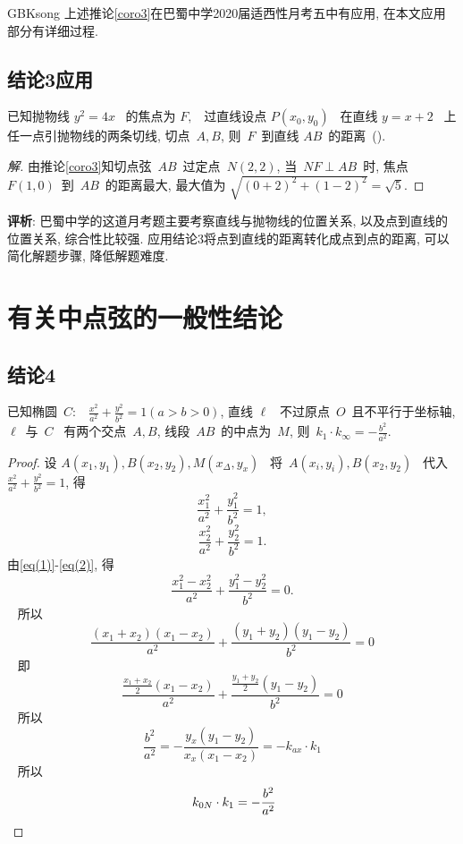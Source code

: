 \documentclass[a4paper, 12pt, twoside]{ctexart}
\begin{document}
\begin{CJK*}{GBK}{song}
        上述推论\ref{coro3}在巴蜀中学2020届适西性月考五中有应用, 在本文应用部分有详细过程.
\subsection{结论3应用}
    \begin{exa}
        已知抛物线 $y^2=4 x$~ 的焦点为 $F, $~ 过直线设点 $P(x_0, y_0)$~ 在直线 $y=x+2$~ 上任一点引抛物线的两条切线, 切点~$A,B$, 则~$F$~到直线 $AB$~的距离~\hfill(\quad).\smallskip
    \end{exa}
    \begin{proof}[解]
        由推论\ref{coro3}知切点弦~$AB$~过定点~$N(2,2)$, 当~$NF\perp AB$~时, 焦点 $F(1, 0)$~到~$AB$~的距离最大, 最大值为 $\sqrt{(0+2)^{2}+(1-2)^{2}}=\sqrt{5}$.
    \end{proof}

    \textbf{评析}: 巴蜀中学的这道月考题主要考察直线与抛物线的位置关系,  以及点到直线的位置关系,  综合性比较强. 应用结论3将点到直线的距离转化成点到点的距离, 可以简化解题步骤,  降低解题难度.

\section{有关中点弦的一般性结论}
\subsection{结论4}\newpage
    \begin{propt}\label{propt10}
        已知椭圆~$C:$~  $\frac{x^2}{a^2}+\frac{y^2}{b^2}=1(a>b>0)$, 直线 $\ell$~ 不过原点~$O$~且不平行于坐标轴, $\ell$~与~$C$~ 有两个交点~$A,B$,   线段~$AB$~的中点为~$M$, 则~$k_1\cdot k_{\infty}=-\frac{b^2}{a^2}$.
    \end{propt}
    \begin{proof}
        设 $A(x_1, y_1),  B(x_2,y_2),  M\left(x_{\Delta},  y_{x}\right)$~ 将~$A(x_i,y_i),  B(x_2,y_2)$~
代入~$\frac{x^2}{a^2}+\frac{y^2}{b^2}=1$, 得~
    \begin{equation}\label{eq(1)}
        \frac{x_1^{2}}{a^2}+\frac{y_{1}^{2}}{b^2}=1,
    \end{equation}
    \begin{equation}\label{eq(2)}
        \frac{x_2^{2}}{a^2}+\frac{y_{2}^{2}}{b^2}=1.
    \end{equation}
    由\eqref{eq(1)}-\eqref{eq(2)}, 得
    $$\frac{x_1^{2}-x_2^{2}}{a^2}+\frac{y_{1}^{2}-y_{2}^{2}}{b^2}=0.$$~
所以 $$~\frac{\left(x_1+x_2\right)\left(x_1-x_2\right)}{a^2}+\frac{\left(y_{1}+y_{2}\right)\left(y_{1}-y_{2}\right)}{b^2}=0~$$~
即 $$~\frac{\frac{x_1+x_2}{2}\left(x_1-x_2\right)}{a^2}+\frac{\frac{y_{1}+y_{2}}{2}\left(y_{1}-y_{2}\right)}{b^2}=0~$$~
所以
~$$~\frac{b^2}{a^2}=-\frac{y_{x}\left(y_{1}-y_{2}\right)}{x_{x}\left(x_1-x_2\right)}=-k_{a x} \cdot k_{1}~$$~
所以
~$$~
k_{0 N} \cdot k_{1}=-\frac{b^2}{a^2}\myback$$
\end{proof}


\end{CJK*}
\end{document}
